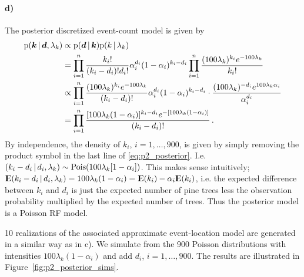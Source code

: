 \paragraph{d)}
The posterior discretized  event-count model is given by
%
\begin{equation}
\label{eq:p2_posterior}
\begin{split}
    \mathrm{p}(\bm{k} \, | \, \bm{d}, \lambda_k) &\propto \mathrm{p}(\bm{d} \, | \, \bm{k}) \mathrm{p}(k \, | \, \lambda_k) \\
    &= \prod_{i=1}^n \frac{k_i!}{(k_i - d_i)!d_i!} \alpha_i^{d_i} (1 - \alpha_i)^{k_i - d_i} \prod_{i=1}^n \frac{(100\lambda_k)^{k_i} e^{-100\lambda_k}}{k_i!} \\
    &\propto \prod_{i=1}^n \frac{(100\lambda_k)^{k_i} e^{-100\lambda_k}}{(k_i - d_i)!} \alpha_i^{d_i} (1 - \alpha_i)^{k_i - d_i} \cdot \frac{(100\lambda_k)^{-d_i} e^{100\lambda_k\alpha_i}}{\alpha_i^{d_i}} \\
    &= \prod_{i=1}^n \frac{[100\lambda_k(1-\alpha_i)]^{k_i-d_i} e^{-[100\lambda_k(1-\alpha_i)]}}{(k_i-d_i)!} \, .
\end{split}
\end{equation}
%
By independence, the density of $k_i$, $i = 1, \dots, 900$, is given by simply removing the product symbol in the last line of \eqref{eq:p2_posterior}. I.e. $(k_i - d_i \, | \, d_i, \lambda_k) \sim \mathrm{Pois}(100\lambda_k[1-\alpha_i])$. This makes sense intuitively; ${\rm I\kern-.3em E}(k_i - d_i \, | \, d_i, \lambda_k) = 100\lambda_k(1-\alpha_i) = {\rm I\kern-.3em E}(k_i) - \alpha_i{\rm I\kern-.3em E}(k_i)$, i.e. the expected difference between $k_i$ and $d_i$ is just the expected number of pine trees less the observation probability multiplied by the expected number of trees. Thus the posterior model is a Poisson RF model.

10 realizations of the associated approximate event-location model are generated in a similar way as in c). We simulate from the 900 Poisson distributions with intensities $100\lambda_k(1-\alpha_i)$ and add $d_i$, $i = 1, \dots, 900$. The results are illustrated in Figure~\ref{fig:p2_posterior_sims}.


